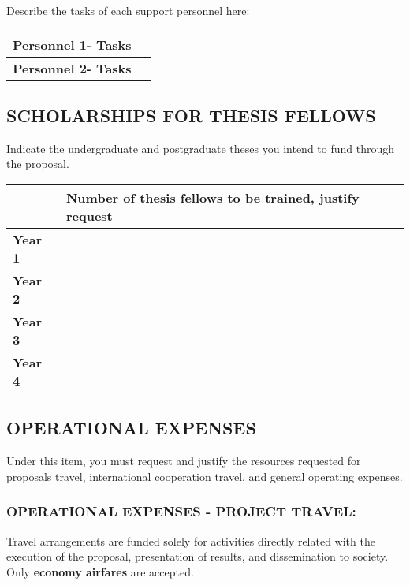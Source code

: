 \noindent Describe the tasks of each support personnel here:

\smallskip

\noindent\begin{tabularx}{\linewidth}{|m{.3\linewidth}|X|}
\hline
\cellcolor{tcc}\textbf{Personnel 1- Tasks} & \\\hline
\cellcolor{tcc}\textbf{Personnel 2- Tasks} & \\\hline
\end{tabularx}


\subsection*{\uppercase{Scholarships for thesis fellows}}

Indicate the undergraduate and postgraduate theses you intend to fund through the proposal.

\medskip

\noindent\begin{tabularx}{\textwidth}{m{3.23cm}|X|}
\hhline{~-}
& \cellcolor{tcc}\textbf{Number of thesis fellows to be trained, justify request}\\
\hline
\multicolumn{1}{|l|}{\cellcolor{tcc}\textbf{Year 1}} & \\
\hline
\multicolumn{1}{|l|}{\cellcolor{tcc}\textbf{Year 2}} & \\
\hline
\multicolumn{1}{|l|}{\cellcolor{tcc}\textbf{Year 3}} & \\
\hline
\multicolumn{1}{|l|}{\cellcolor{tcc}\textbf{Year 4}} & \\
\hline
\end{tabularx}


\subsection*{\uppercase{Operational expenses}}

Under this item, you must request and justify the resources requested for proposals travel, international cooperation travel, and general operating expenses.

\subsubsection*{\uppercase{Operational expenses - Project travel:}}

Travel arrangements are funded solely for activities directly related with the execution of the proposal, presentation of results, and dissemination to society.
Only \textbf{economy airfares} are accepted.

